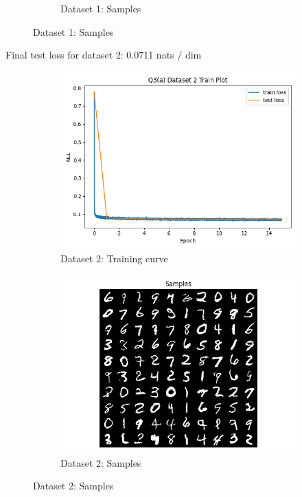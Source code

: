 \documentclass{article}
\begin{document}
\begin{enumerate}[(a)]
\begin{figure}[H]
\begin{subfigure}{0.45\textwidth}
        \caption{Dataset 1: Samples}
    \end{subfigure}
\end{figure}
Final test loss for dataset 2: 0.0711 nats / dim
\begin{figure}[H]
    \centering
    \begin{subfigure}{0.45\textwidth}
        \centering
        \includegraphics[width=\textwidth]{figures/q3_a_dset2_train_plot.png}
        \caption{Dataset 2: Training curve}
    \end{subfigure}
    \hspace{0.2in}
    \begin{subfigure}{0.45\textwidth}
        \centering
        \includegraphics[width=\textwidth]{figures/q3_a_dset2_samples.png}
        \caption{Dataset 2: Samples}
    \end{subfigure}
\end{figure}


\end{enumerate}
\end{document}
